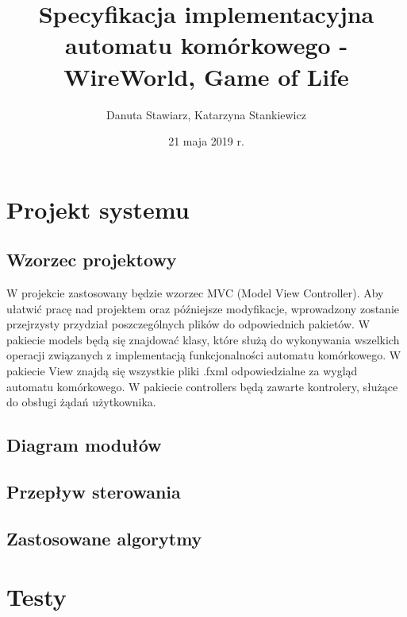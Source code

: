 \documentclass[10pt, oneside]{article}
\title{Specyfikacja implementacyjna automatu komórkowego - WireWorld, Game of Life}
\author{Danuta Stawiarz, Katarzyna Stankiewicz}
\date{21 maja 2019 r.}
\begin{document}
\maketitle
\tableofcontents
\newpage	

\section{Projekt systemu}
\subsection{Wzorzec projektowy}
W projekcie zastosowany będzie wzorzec MVC (Model View Controller). Aby ułatwić pracę nad projektem oraz późniejsze modyfikacje, wprowadzony zostanie przejrzysty przydział poszczególnych plików do odpowiednich pakietów. 
W pakiecie models będą się znajdować klasy, które służą do wykonywania wszelkich operacji związanych z implementacją funkcjonalności automatu komórkowego.
W pakiecie View znajdą się wszystkie pliki .fxml odpowiedzialne za wygląd automatu komórkowego.
W pakiecie controllers będą zawarte kontrolery, służące do obsługi żądań użytkownika.

\subsection{Diagram modułów}

\subsection{Przepływ sterowania}

\subsection{Zastosowane algorytmy}


\section{Testy}
\end{document}
